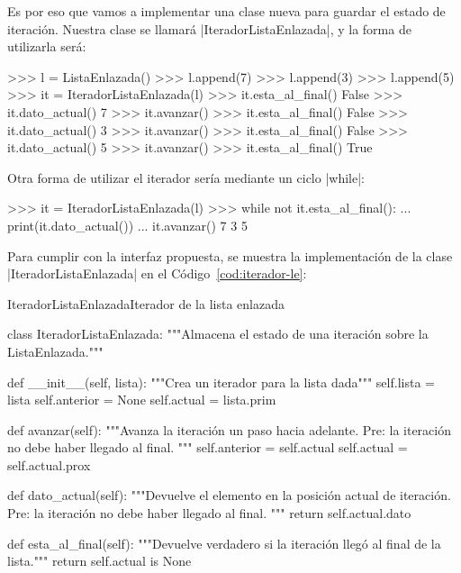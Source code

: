Es por eso que vamos a implementar una clase nueva para guardar el estado de
iteración. Nuestra clase se llamará |IteradorListaEnlazada|, y la forma de
utilizarla será:

\begin{codigo-python-sn}
>>> l = ListaEnlazada()
>>> l.append(7)
>>> l.append(3)
>>> l.append(5)
>>> it = IteradorListaEnlazada(l)
>>> it.esta_al_final()
False
>>> it.dato_actual()
7
>>> it.avanzar()
>>> it.esta_al_final()
False
>>> it.dato_actual()
3
>>> it.avanzar()
>>> it.esta_al_final()
False
>>> it.dato_actual()
5
>>> it.avanzar()
>>> it.esta_al_final()
True
\end{codigo-python-sn}

Otra forma de utilizar el iterador sería mediante un ciclo |while|:

\begin{codigo-python-sn}
>>> it = IteradorListaEnlazada(l)
>>> while not it.esta_al_final():
...     print(it.dato_actual())
...     it.avanzar()
7
3
5
\end{codigo-python-sn}

Para cumplir con la interfaz propuesta, se muestra la implementación de la
clase |IteradorListaEnlazada| en el Código~\ref{cod:iterador-le}:

\begin{codigo}{IteradorListaEnlazada}{Iterador de la lista enlazada}
\label{cod:iterador-le}
\begin{codigo-python}
class IteradorListaEnlazada:
    """Almacena el estado de una iteración sobre la ListaEnlazada."""

    def __init__(self, lista):
        """Crea un iterador para la lista dada"""
        self.lista = lista
        self.anterior = None
        self.actual = lista.prim

    def avanzar(self):
        """Avanza la iteración un paso hacia adelante.
        Pre: la iteración no debe haber llegado al final.
        """
        self.anterior = self.actual
        self.actual = self.actual.prox

    def dato_actual(self):
        """Devuelve el elemento en la posición actual de iteración.
        Pre: la iteración no debe haber llegado al final.
        """
        return self.actual.dato

    def esta_al_final(self):
        """Devuelve verdadero si la iteración llegó al final de la lista."""
        return self.actual is None
\end{codigo-python}
\end{codigo}

